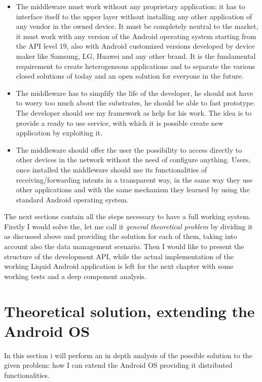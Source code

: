 \begin{itemize}
	\item The middleware must work without any proprietary application: it has to interface itself to the upper layer without installing any other application of any vendor in the owned device. It must be completely neutral to the market, it must work with any version of the Android operating system starting from the API level 19, also with Android customized versions developed by device maker like Samsung, LG, Huawei and any other brand. It is the fundamental requirement to create heterogeneous applications and to separate the various closed solutions of today and an open solution for everyone in the future.
	\item The middleware has to simplify the life of the developer, he should not have to worry too much about the substrates, he should be able to fast prototype. The developer should see my framework as help for his work. The idea is to provide a ready to use service, with which it is possible create new application by exploiting it.
	\item The middleware should offer the user the possibility to access directly to other devices in the network without the need of configure anything. Users, once installed the middleware should use its functionalities of receiving/forwarding intents in a transparent way, in the same way they use other applications and with the same mechanism they learned by using the standard Android operating system.
\end{itemize}
The next sections contain all the steps necessary to have a full working system.
Firstly I would solve the, let me call it \textit{general theoretical problem} by dividing it as discussed above and providing the solution for each of them, taking into account also the data management scenario. Then I would like to present the structure of the development API, while the actual implementation of the working Liquid Android application is left for the next chapter with some working tests and a deep component analysis.



\section{Theoretical solution, extending the Android OS}
\par In this section i will perform an in depth analysis of the possible solution to the given problem: how I can extend the Android OS providing it distributed functionalities.
